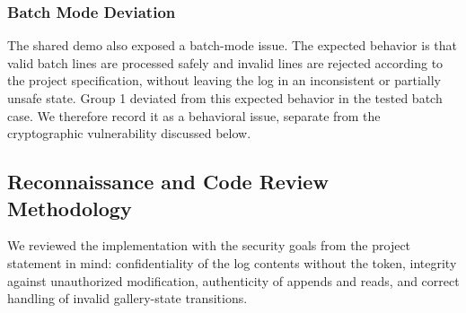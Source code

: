 \documentclass[a4paper, 12pt]{article}
\begin{document}
    \subsubsection{Batch Mode Deviation}
    The shared demo also exposed a batch-mode issue. The expected behavior is that valid batch lines are processed safely and invalid lines are rejected according to the project specification, without leaving the log in an inconsistent or partially unsafe state. Group 1 deviated from this expected behavior in the tested batch case. We therefore record it as a behavioral issue, separate from the cryptographic vulnerability discussed below.

    \subsection{Reconnaissance and Code Review Methodology}
    We reviewed the implementation with the security goals from the project statement in mind: confidentiality of the log contents without the token, integrity against unauthorized modification, authenticity of appends and reads, and correct handling of invalid gallery-state transitions.
\end{document}
